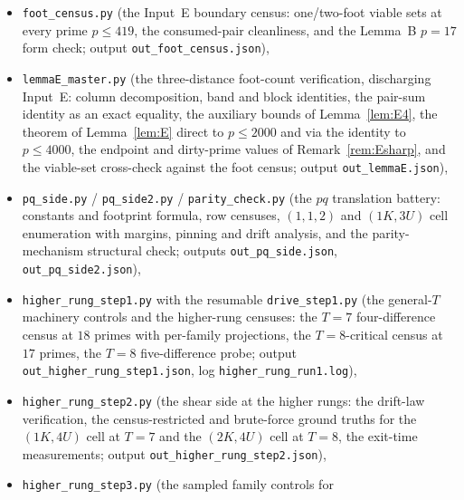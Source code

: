 \begin{itemize}[leftmargin=2.2em,itemsep=1pt,topsep=2pt]
        verification: identity checks on all exceptions and census
        coverings, sharp-form sampling, kernel checks, the four-family
        census with per-multiset counts, defect statistics, and the
        witness/solution count reconciliation; output
        \texttt{out\_groupring\_bridge.json}, log
        \texttt{groupring\_run.log}),
  \item \texttt{foot\_census.py} (the Input~E boundary census: one/two-foot
        viable sets at every prime $p\le419$, the consumed-pair
        cleanliness, and the Lemma~B $p=17$ form check; output
        \texttt{out\_foot\_census.json}),
  \item \texttt{lemmaE\_master.py} (the three-distance foot-count
        verification, discharging Input~E: column decomposition, band and
        block identities, the pair-sum identity as an exact equality, the
        auxiliary bounds of Lemma~\ref{lem:E4}, the theorem of
        Lemma~\ref{lem:E} direct to $p\le2000$ and via the identity to
        $p\le4000$, the endpoint and dirty-prime values of
        Remark~\ref{rem:Esharp}, and the viable-set cross-check against
        the foot census; output \texttt{out\_lemmaE.json}),
  \item \texttt{pq\_side.py} / \texttt{pq\_side2.py} / \texttt{parity\_check.py}
        (the $pq$ translation battery: constants and footprint formula,
        row censuses, $(1,1,2)$ and $(1K,3U)$ cell enumeration with
        margins, pinning and drift analysis, and the parity-mechanism
        structural check; outputs \texttt{out\_pq\_side.json},
        \texttt{out\_pq\_side2.json}),
  \item \texttt{higher\_rung\_step1.py} with the resumable
        \texttt{drive\_step1.py} (the general-$T$ machinery controls and
        the higher-rung censuses: the $T=7$ four-difference census at
        $18$ primes with per-family projections, the $T=8$-critical
        census at $17$ primes, the $T=8$ five-difference probe; output
        \texttt{out\_higher\_rung\_step1.json}, log
        \texttt{higher\_rung\_run1.log}),
  \item \texttt{higher\_rung\_step2.py} (the shear side at the higher
        rungs: the drift-law verification, the census-restricted and
        brute-force ground truths for the $(1K,4U)$ cell at $T=7$ and the
        $(2K,4U)$ cell at $T=8$, the exit-time measurements; output
        \texttt{out\_higher\_rung\_step2.json}),
  \item \texttt{higher\_rung\_step3.py} (the sampled family controls for

\end{itemize}
